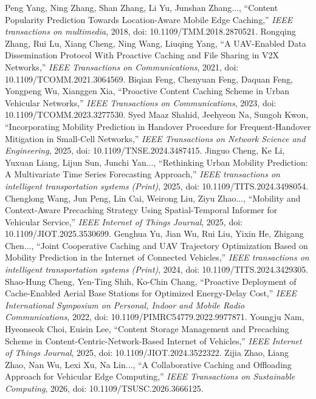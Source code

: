 Peng Yang, Ning Zhang, Shan Zhang, Li Yu, Junshan Zhang..., ``Content Popularity Prediction Towards Location-Aware Mobile Edge Caching,'' \textit{IEEE transactions on multimedia}, 2018, doi: 10.1109/TMM.2018.2870521.
Rongqing Zhang, Rui Lu, Xiang Cheng, Ning Wang, Liuqing Yang, ``A UAV-Enabled Data Dissemination Protocol With Proactive Caching and File Sharing in V2X Networks,'' \textit{IEEE Transactions on Communications}, 2021, doi: 10.1109/TCOMM.2021.3064569.
Biqian Feng, Chenyuan Feng, Daquan Feng, Yongpeng Wu, Xianggen Xia, ``Proactive Content Caching Scheme in Urban Vehicular Networks,'' \textit{IEEE Transactions on Communications}, 2023, doi: 10.1109/TCOMM.2023.3277530.
Syed Maaz Shahid, Jeehyeon Na, Sungoh Kwon, ``Incorporating Mobility Prediction in Handover Procedure for Frequent-Handover Mitigation in Small-Cell Networks,'' \textit{IEEE Transactions on Network Science and Engineering}, 2025, doi: 10.1109/TNSE.2024.3487415.
Jinguo Cheng, Ke Li, Yuxuan Liang, Lijun Sun, Junchi Yan..., ``Rethinking Urban Mobility Prediction: A Multivariate Time Series Forecasting Approach,'' \textit{IEEE transactions on intelligent transportation systems (Print)}, 2025, doi: 10.1109/TITS.2024.3498054.
Chenglong Wang, Jun Peng, Lin Cai, Weirong Liu, Ziyu Zhao..., ``Mobility and Context-Aware Precaching Strategy Using Spatial-Temporal Informer for Vehicular Service,'' \textit{IEEE Internet of Things Journal}, 2025, doi: 10.1109/JIOT.2025.3530699.
Genghua Yu, Jian Wu, Rui Liu, Yixin He, Zhigang Chen..., ``Joint Cooperative Caching and UAV Trajectory Optimization Based on Mobility Prediction in the Internet of Connected Vehicles,'' \textit{IEEE transactions on intelligent transportation systems (Print)}, 2024, doi: 10.1109/TITS.2024.3429305.
Shao-Hung Cheng, Yen-Ting Shih, Ko-Chin Chang, ``Proactive Deployment of Cache-Enabled Aerial Base Stations for Optimized Energy-Delay Cost,'' \textit{IEEE International Symposium on Personal, Indoor and Mobile Radio Communications}, 2022, doi: 10.1109/PIMRC54779.2022.9977871.
Youngju Nam, Hyeonseok Choi, Euisin Lee, ``Content Storage Management and Precaching Scheme in Content-Centric-Network-Based Internet of Vehicles,'' \textit{IEEE Internet of Things Journal}, 2025, doi: 10.1109/JIOT.2024.3522322.
Zijia Zhao, Liang Zhao, Nan Wu, Lexi Xu, Na Lin..., ``A Collaborative Caching and Offloading Approach for Vehicular Edge Computing,'' \textit{IEEE Transactions on Sustainable Computing}, 2026, doi: 10.1109/TSUSC.2026.3666125.

